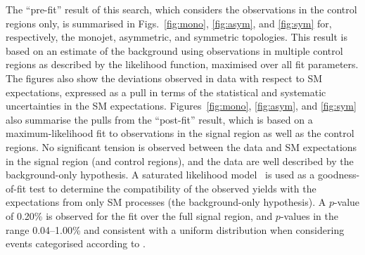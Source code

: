 
The ``pre-fit'' result of this search, which considers the
observations in the control regions only, is summarised in
Figs.~\ref{fig:mono}, \ref{fig:asym}, and \ref{fig:sym} for,
respectively, the monojet, asymmetric, and symmetric topologies. This
result is based on an estimate of the \znunuj background using
observations in multiple control regions as described by the
likelihood function, maximised over all fit parameters. The figures
also show the deviations observed in data with respect to SM
expectations, expressed as a pull in terms of the statistical and
systematic uncertainties in the SM expectations. 
Figures~\ref{fig:mono}, \ref{fig:asym}, and \ref{fig:sym} also
summarise the pulls from the ``post-fit'' result, which is based on a
maximum-likelihood fit to observations in the signal region as well as
the control regions. No significant tension is observed between the
data and SM expectations in the signal region (and control regions),
and the data are well described by the background-only hypothesis. A
saturated likelihood model~\cite{} is used as a goodness-of-fit test
to determine the compatibility of the observed yields with the
expectations from only SM processes (\ie the background-only
hypothesis). A $p$-value of 0.20\% is observed for the fit over the
full signal region, and $p$-values in the range 0.04--1.00\% and
consistent with a uniform distribution when considering events
categorised according to \njet.


